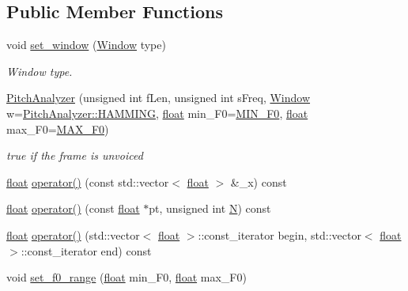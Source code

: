 \subsection*{Public Member Functions}
\begin{DoxyCompactItemize}
\item 
void \hyperlink{classupc_1_1PitchAnalyzer_a96cc042a650825b25ca39c41beebd0db}{set\+\_\+window} (\hyperlink{classupc_1_1PitchAnalyzer_ab82b7694d6bc72839e5be6e526be81b6}{Window} type)
\begin{DoxyCompactList}\small\item\em Window type. \end{DoxyCompactList}\item 
\hyperlink{classupc_1_1PitchAnalyzer_ae7cfb918feadd7d56f5736e4ef600c06}{Pitch\+Analyzer} (unsigned int f\+Len, unsigned int s\+Freq, \hyperlink{classupc_1_1PitchAnalyzer_ab82b7694d6bc72839e5be6e526be81b6}{Window} w=\hyperlink{classupc_1_1PitchAnalyzer_ab82b7694d6bc72839e5be6e526be81b6a20e793e736a503aacbed0294970a9b33}{Pitch\+Analyzer\+::\+H\+A\+M\+M\+I\+NG}, \hyperlink{FFTReal__readme_8txt_a0ea2fae2a8106200bf378b90eae003cf}{float} min\+\_\+\+F0=\hyperlink{namespaceupc_ae8ed4ce6dc2c05dfc1aa6432db41e1ae}{M\+I\+N\+\_\+\+F0}, \hyperlink{FFTReal__readme_8txt_a0ea2fae2a8106200bf378b90eae003cf}{float} max\+\_\+\+F0=\hyperlink{namespaceupc_ab69be42753266b6e1a0deaa8eba56a19}{M\+A\+X\+\_\+\+F0})
\begin{DoxyCompactList}\small\item\em true if the frame is unvoiced \end{DoxyCompactList}\item 
\hyperlink{FFTReal__readme_8txt_a0ea2fae2a8106200bf378b90eae003cf}{float} \hyperlink{classupc_1_1PitchAnalyzer_a2cd33d0cbfc699c43f570442190ca9e6}{operator()} (const std\+::vector$<$ \hyperlink{FFTReal__readme_8txt_a0ea2fae2a8106200bf378b90eae003cf}{float} $>$ \&\+\_\+x) const 
\item 
\hyperlink{FFTReal__readme_8txt_a0ea2fae2a8106200bf378b90eae003cf}{float} \hyperlink{classupc_1_1PitchAnalyzer_a00aef276755224ed20668f3b1b3f16d1}{operator()} (const \hyperlink{FFTReal__readme_8txt_a0ea2fae2a8106200bf378b90eae003cf}{float} $\ast$pt, unsigned int \hyperlink{FFTReal__readme_8txt_a049dd452c22185832440207517cffdaa}{N}) const 
\item 
\hyperlink{FFTReal__readme_8txt_a0ea2fae2a8106200bf378b90eae003cf}{float} \hyperlink{classupc_1_1PitchAnalyzer_a2f924f9f45df090463be1498518934ab}{operator()} (std\+::vector$<$ \hyperlink{FFTReal__readme_8txt_a0ea2fae2a8106200bf378b90eae003cf}{float} $>$\+::const\+\_\+iterator begin, std\+::vector$<$ \hyperlink{FFTReal__readme_8txt_a0ea2fae2a8106200bf378b90eae003cf}{float} $>$\+::const\+\_\+iterator end) const 
\item 
void \hyperlink{classupc_1_1PitchAnalyzer_ac33887654b62b3f90c3de231ec187d94}{set\+\_\+f0\+\_\+range} (\hyperlink{FFTReal__readme_8txt_a0ea2fae2a8106200bf378b90eae003cf}{float} min\+\_\+\+F0, \hyperlink{FFTReal__readme_8txt_a0ea2fae2a8106200bf378b90eae003cf}{float} max\+\_\+\+F0)
\end{DoxyCompactItemize}
